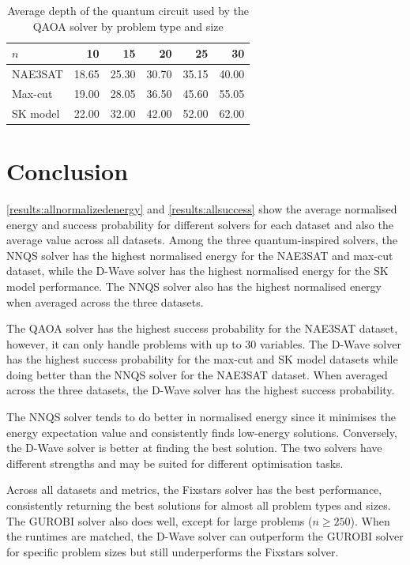 \begin{table}[!htb]
    \centering
    \caption{Average depth of the quantum circuit used by the QAOA solver by problem type and size}
    \label{table:depth}
    \begin{tabular}{lrrrrr} \toprule
        $n$ & 10 & 15 & 20 & 25 & 30\\ \midrule
        NAE3SAT & 18.65 & 25.30 & 30.70 & 35.15 & 40.00 \\
        Max-cut & 19.00 & 28.05 & 36.50 & 45.60 & 55.05 \\
        SK model & 22.00 & 32.00 & 42.00 & 52.00 & 62.00\\ \bottomrule
    \end{tabular}
\end{table}

\section{Conclusion}
\autoref{results:allnormalizedenergy} and \autoref{results:allsuccess} show the average normalised energy and success probability for different solvers for each dataset and also the average value across all datasets. Among the three quantum-inspired solvers, the NNQS solver has the highest normalised energy for the NAE3SAT and max-cut dataset, while the D-Wave solver has the highest normalised energy for the SK model performance. The NNQS solver also has the highest normalised energy when averaged across the three datasets. 

The QAOA solver has the highest success probability for the NAE3SAT dataset, however, it can only handle problems with up to $30$ variables. The D-Wave solver has the highest success probability for the max-cut and SK model datasets while doing better than the NNQS solver for the NAE3SAT dataset. When averaged across the three datasets, the D-Wave solver has the highest success probability.

The NNQS solver tends to do better in normalised energy since it minimises the energy expectation value and consistently finds low-energy solutions. Conversely, the D-Wave solver is better at finding the best solution. The two solvers have different strengths and may be suited for different optimisation tasks.

Across all datasets and metrics, the Fixstars solver has the best performance, consistently returning the best solutions for almost all problem types and sizes. The GUROBI solver also does well, except for large problems ($n\geq 250$). When the runtimes are matched, the D-Wave solver can outperform the GUROBI solver for specific problem sizes but still underperforms the Fixstars solver. 

